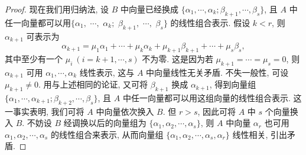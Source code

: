 \documentclass[../../main.tex]{subfiles}%
\begin{document}
\begin{proof}
现在我们用归纳法, 设 \( B \) 中向量已经换成 \( \{\alpha_1, \cdots, \alpha_k; \beta_{k+1}, \cdots, \beta_s\} \), 且 \( A \) 中任一向量都可以用$\{\alpha_1,$ $ \cdots,$ $ \alpha_k;$ $ \beta_{k+1},$ $\cdots,$ $\beta_s\}$ 的线性组合表示. 假设 \( k < r \), 则 \( \alpha_{k+1} \) 可表示为
\[
\alpha_{k+1} = \mu_1\alpha_1 + \cdots + \mu_k\alpha_k + \mu_{k+1}\beta_{k+1} + \cdots + \mu_s\beta_s,
\]
其中至少有一个 \( \mu_i \ (i = k+1, \cdots, s) \) 不为零. 这是因为若 \( \mu_{k+1} = \cdots = \mu_s = 0 \), 则 \( \alpha_{k+1} \) 可用 \( \alpha_1, \cdots, \alpha_k \) 线性表示, 这与 \( A \) 中向量线性无关矛盾. 不失一般性, 可设 \( \mu_{k+1} \neq 0 \). 用与上述相同的论证, 又可将 \( \beta_{k+1} \) 换成 \( \alpha_{k+1} \), 得到向量组 \( \{\alpha_1, \cdots, \alpha_{k+1}; \beta_{k+2}, \cdots, \beta_s\} \), 且 \( A \) 中任一向量都可以用这组向量的线性组合表示. 这一事实表明, 我们可将 \( A \) 中向量依次换入 \( B \). 但 \( r > s \), 因此可将 \( A \) 中 \( s \) 个向量换入 \( B \). 不妨设 \( B \) 经调换以后的向量组为 \( \{\alpha_1, \alpha_2, \cdots, \alpha_s\} \), 则 \( A \) 中向量 \( \alpha_r \) 也可用 \( \alpha_1, \alpha_2, \cdots, \alpha_s \) 的线性组合来表示, 从而向量组 \( \{\alpha_1, \alpha_2, \cdots, \alpha_s, \alpha_r\} \) 线性相关, 引出矛盾.
\end{proof}
\end{document}
